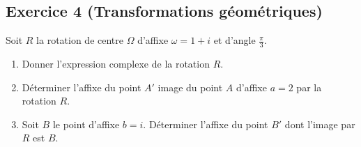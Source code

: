 \documentclass{article}
\begin{document}
	\subsection*{Exercice 4 (Transformations géométriques)}
	Soit $R$ la rotation de centre $\Omega$ d'affixe $\omega = 1 + i$ et d'angle $\frac{\pi}{3}$.
	\begin{enumerate}
		\item Donner l'expression complexe de la rotation $R$.
		\item Déterminer l'affixe du point $A'$ image du point $A$ d'affixe $a = 2$ par la rotation $R$.
		\item Soit $B$ le point d'affixe $b = i$. Déterminer l'affixe du point $B'$ dont l'image par $R$ est $B$.
	\end{enumerate}
	
\end{document}
